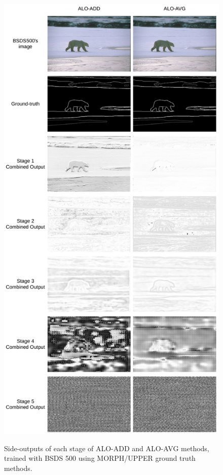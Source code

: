 \begin{figure}%
  \centering
  \caption{Side-outputs of each stage of ALO-ADD and ALO-AVG methods, trained with BSDS 500 using MORPH/UPPER ground truth methods.}
  \includegraphics[width=0.8\columnwidth]{../imagens/ilustracoes/cap6_bsds_stage_outputs.png}
  \sourceOwn
  \label{fig:bsds_stage_outputs}
\end{figure}

